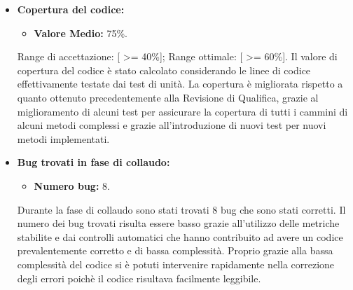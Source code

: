 \begin{itemize}
	
	\item \textbf{Copertura del codice:}
	\begin{itemize}
		\item \textbf{Valore Medio:} 75\%.
	\end{itemize}
		Range di accettazione: [ >= 40\%];\newline
		Range ottimale: [ >= 60\%].\newline
	Il valore di copertura del codice è stato calcolato considerando le linee di codice effettivamente
	testate dai test di unità. La copertura è migliorata rispetto a quanto ottenuto 	precedentemente alla Revisione di Qualifica, grazie al miglioramento di alcuni test per assicurare la copertura di tutti i cammini di alcuni metodi complessi e grazie all'introduzione di nuovi test per nuovi metodi implementati.

	
	\item \textbf{Bug trovati in fase di collaudo:}
	\begin{itemize}
		\item \textbf{Numero bug:} 8.
	\end{itemize}
	Durante la fase di collaudo sono stati trovati 8 bug che sono stati corretti. Il numero dei bug trovati risulta essere basso grazie all'utilizzo delle metriche stabilite e dai controlli automatici che hanno contribuito ad avere un codice prevalentemente corretto e di bassa complessità. Proprio grazie alla bassa complessità del codice si è potuti intervenire rapidamente nella correzione degli errori poichè il codice risultava facilmente leggibile.
\end{itemize}